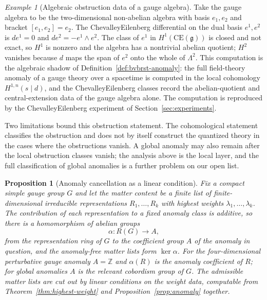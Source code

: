 \documentclass[11pt,letterpaper]{article}
\newtheorem{proposition}[theorem]{Proposition}
\theoremstyle{definition}
\theoremstyle{remark}
\newtheorem{example}[theorem]{Example}
\begin{document}
\begin{example}[Algebraic obstruction data of a gauge algebra]
\label{ex:abelian-anomaly}
Take the gauge algebra to be the two-dimensional non-abelian algebra with basis $e_1, e_2$ and bracket $[e_1, e_2] = e_2$. The Chevalley\textendash{}Eilenberg differential on the dual basis $e^1, e^2$ is $d e^1 = 0$ and $d e^2 = -e^1 \wedge e^2$. The class of $e^1$ in $H^1(\mathrm{CE}(\mathfrak{g}))$ is closed and not exact, so $H^1$ is nonzero and the algebra has a nontrivial abelian quotient; $H^2$ vanishes because $d$ maps the span of $e^2$ onto the whole of $\Lambda^2$. This computation is the algebraic shadow of Definition~\ref{def:bvbrst-anomaly}: the full field-theory anomaly of a gauge theory over a spacetime is computed in the local cohomology $H^{1,n}(s\mid d)$, and the Chevalley\textendash{}Eilenberg classes record the abelian-quotient and central-extension data of the gauge algebra alone. The computation is reproduced by the Chevalley\textendash{}Eilenberg experiment of Section~\ref{sec:experiments}.
\end{example}

Two limitations bound this obstruction statement. The cohomological statement classifies the obstruction and does not by itself construct the quantized theory in the cases where the obstructions vanish. A global anomaly may also remain after the local obstruction classes vanish; the analysis above is the local layer, and the full classification of global anomalies is a further problem on our open list.

\begin{proposition}[Anomaly cancellation as a linear condition]
\label{prop:cancellation}
Fix a compact simple gauge group $G$ and let the matter content be a finite list of finite-dimensional irreducible representations $R_1, \ldots, R_k$ with highest weights $\lambda_1, \ldots, \lambda_k$. The contribution of each representation to a fixed anomaly class is additive, so there is a homomorphism of abelian groups
\[
\alpha \colon R(G) \longrightarrow A,
\]
from the representation ring of $G$ to the coefficient group $A$ of the anomaly in question, and the anomaly-free matter lists form $\ker \alpha$. For the four-dimensional perturbative gauge anomaly $A = \mathbb{Z}$ and $\alpha(R)$ is the anomaly coefficient of $R$; for global anomalies $A$ is the relevant cobordism group of $G$. The admissible matter lists are cut out by linear conditions on the weight data, computable from Theorem~\ref{thm:highest-weight} and Proposition~\ref{prop:anomaly} together.
\end{proposition}
\end{document}
